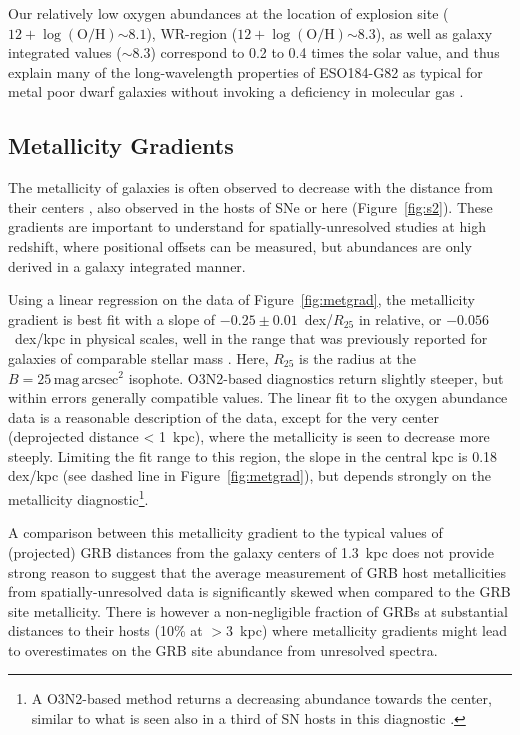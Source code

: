 \documentclass[traditabstract]{aa}
\newcommand{\oh}{$12+\log(\mathrm{O/H})$}
\begin{document}
Our relatively low oxygen abundances at the location of explosion site (\oh$\sim8.1$), WR-region (\oh$\sim8.3$), as well as galaxy integrated values ($\sim8.3$) correspond to 0.2 to 0.4 times the solar value, and thus explain many of the long-wavelength properties of ESO184-G82 as typical for metal poor dwarf galaxies without invoking a deficiency in molecular gas \citep{2016arXiv160901742M}.


\subsection{Metallicity Gradients}
\label{sec:metgrad}

The metallicity of galaxies is often observed to decrease with the distance from their centers \citep[e.g.][]{1994ApJ...420...87Z, 2014A&A...563A..49S}, also observed in the hosts of SNe \citep{2016A&A...591A..48G} or here (Figure~\ref{fig:s2}). These gradients are important to understand for spatially-unresolved studies at high redshift, where positional offsets can be measured, but abundances are only derived in a galaxy integrated manner. 

Using a linear regression on the data of Figure~\ref{fig:metgrad}, the metallicity gradient is best fit with a slope of $-0.25\pm0.01$~dex/$R_{25}$ in relative, or $-0.056$~dex/kpc in physical scales, well in the range that was previously reported for galaxies of comparable stellar mass \citep{2015MNRAS.448.2030H}. Here, $R_{25}$ is the radius at the $B=25\,\mathrm{mag}\,\mathrm{arcsec}^2$ isophote. O3N2-based diagnostics return slightly steeper, but within errors generally compatible values. The linear fit to the oxygen abundance data is a reasonable description of the data, except for the very center (deprojected distance < 1~kpc), where the metallicity is seen to decrease more steeply. Limiting the fit range to this region, the slope in the central kpc is 0.18 dex/kpc (see dashed line in Figure~\ref{fig:metgrad}), but depends strongly on the metallicity diagnostic\footnote{A O3N2-based method returns a decreasing abundance towards the center, similar to what is seen also in a third of SN hosts in this diagnostic \citep{2016A&A...591A..48G}.}.

A comparison between this metallicity gradient to the typical values of (projected) GRB distances from the galaxy centers of 1.3~kpc \citep{2016ApJ...817..144B} does not provide strong reason to suggest that the average measurement of GRB host metallicities from spatially-unresolved data is significantly skewed when compared to the GRB site metallicity. There is however a non-negligible fraction of GRBs at substantial distances to their hosts (10\% at $>3$~kpc) where metallicity gradients might lead to overestimates on the GRB site abundance from unresolved spectra.
\end{document}
